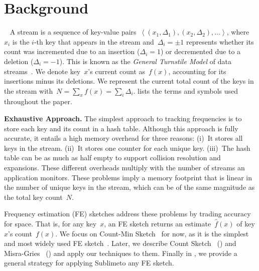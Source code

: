 \documentclass[sigconf]{acmart}
\newcommand{\sketch}{Sublime}
\begin{document}
\section{Background}~\label{sec:background}
A stream is a sequence of key-value pairs~$\left\langle (x_1,\Delta_1), (x_2,\Delta_2), \dots \right\rangle$, where~$x_i$ is the $i$-th key that appears in the stream and~$\Delta_i = \pm1$ represents whether its count was incremented due to an insertion ($\Delta_i=1$) or decremented due to a deletion ($\Delta_i=-1$).
This is known as the \emph{General Turnstile Model} of data streams~\cite{StreamModels}.
We denote key~$x$'s current count as~$f(x)$, accounting for its insertions minus its deletions.
We represent the current total count of the keys in the stream with~$N=\sum_x f(x)=\sum_i \Delta_i$.
 lists the terms and symbols used throughout the paper.

\textbf{Exhaustive Approach.}
The simplest approach to tracking frequencies is to store each key and its count in a hash table.
Although this approach is fully accurate, it entails a high memory overhead for three reasons: 
(i)~It stores all keys in the stream. 
(ii)~It stores one counter for each unique key.
(iii)~The hash table can be as much as half empty to support collision resolution and expansions.
These different overheads multiply with the number of streams an application monitors.
These problems imply a memory footprint that is linear in the number of unique keys in the stream, which can be of the same magnitude as the total key count~$N$.

Frequency estimation (FE) sketches address these problems by trading accuracy for space.
That is, for any key~$x$, an FE sketch returns an estimate~$\hat{f}(x)$ of key $x$'s count~$f(x)$.
We focus on Count-Min Sketch~\cite{CountMin} for now, as it is the simplest and most widely used FE sketch~\cite{ADSMassiveDatasetBook,SketchesTrafficManagementSurvey}.
Later, we describe Count Sketch~\cite{CountSketch} () and Misra-Gries~\cite{MisraGries} () and apply our techniques to them.
Finally in , we provide a general strategy for applying \sketch to any FE sketch.
\end{document}
